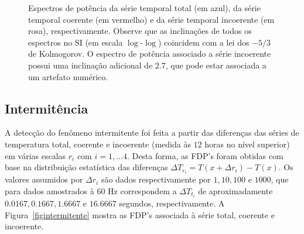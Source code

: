\begin{figure}[ht]
\caption{Espectros de potência da série temporal total (em azul), da série temporal coerente (em vermelho) e da série temporal incoerente (em rosa), respectivamente. Observe que as inclinações de todos os espectros no SI (em escala $\log$-$\log$) coincidem com a lei dos $-5/3$ de Kolmogorov. O espectro de potência associado a série incoerente possui uma inclinação adicional de $2.7$, que pode estar associada a um artefato numérico.}
\label{figespectrotS0681200}
\end{figure}

\subsection{Intermitência}

A detecção do fenômeno intermitente foi feita a partir das diferenças das séries de temperatura total, coerente e incoerente (medida às $12$ horas no nível superior) em várias escalas $r_{i}$ com $i=1,\ldots4$. Desta forma, as FDP's foram obtidas com base na distribuição estatística das diferenças $\Delta T_{r_{i}}=T(x+\Delta r_{i})-T(x)$. Os valores assumidos por $\Delta r_{i}$ são dados respectivamente por $1,10,100$ e $1000$, que para dados amostrados à $60$ Hz correspondem a $\Delta T_{t_{i}}$ de aproximadamente $0.0167,0.1667,1.6667$ e $16.6667$ segundos, respectivamente. A Figura~\ref{figintermitente} mostra as FDP's associada à série total, coerente e incoerente.

